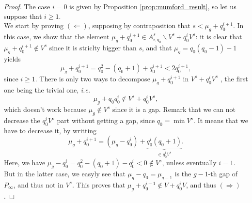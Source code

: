 \documentclass[a4paper]{article}
\begin{document}
\begin{proof} The case $i=0$ is given by Proposition \ref{prop:mumford_result}, so let us suppose that $i \geq 1$. \\
We start by proving $(\Leftarrow)$, supposing by contraposition that $s < \mu_g + q_0^{i+1}$. In this case, we show that the element $\mu_g + q_0^{i+1} \in A^s_{i,q_0} \backslash V^s+q_0^iV^s$: it is clear that $\mu_g + q_0^{i+1} \notin V^s$ since it is striclty bigger than $s$, and that $\mu_g = q_0(q_0-1)-1$ yields
\[\mu_g + q_0^{i+1}=q_0^2-(q_0+1) + q_0^{i+1} < 2q_0^{i+1},\]
since $i \geq 1$. There is only two ways to decompose $\mu_g + q_0^{i+1}$ in $V^s+q_0^iV^s$ , the first one being the trivial one, \emph{i.e.}
\[\mu_g + q_0q_0^{i} \notin V^s+q_0^iV^s,\]
which doesn't work because $\mu_g \notin V^s$ since it is a gap. Remark that we can not decrease the $q_0^iV^s$ part without getting a gap, since $q_0 = \min{V^s}$. It means that we have to decrease it, by writting 
\[\mu_g + q_0^{i+1} = (\mu_g - q_0^i) + \underbrace{q_0^i(q_0+1)}_{\in q^i_0V^s}.\]
Here, we have $\mu_g - q_0^i = q_0^2-(q_0+1)-q_0^i <0 \notin V^s$, unless eventually $i=1$. But in the latter case, we easyly see that $\mu_g-q_0 = \mu_{g-1}$ is the $g-1$-th gap of $P_{\infty}$, and thus not in $V^s$. This proves that $\mu_g + q_0^{i+1} \notin V+q_0^iV$, and thus $(\Rightarrow)$. 


\end{proof}
\end{document}
